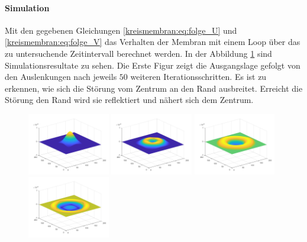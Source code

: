 \paragraph{Simulation}
Mit den gegebenen Gleichungen \ref{kreismembran:eq:folge_U} und \ref{kreismembran:eq:folge_V} das Verhalten der Membran mit einem Loop über das zu untersuchende Zeitintervall berechnet werden. 
In der Abbildung \ref{kreismembran:im:simres_rund} sind Simulationsresultate zu sehen.
Die Erste Figur zeigt die Ausgangslage gefolgt von den Auslenkungen nach jeweils $ 50 $ weiteren Iterationsschritten.
Es ist zu erkennen, wie sich die Störung vom Zentrum an den Rand ausbreitet.
Erreicht die Störung den Rand wird sie reflektiert und nähert sich dem Zentrum. 
\begin{figure}
	\begin{center}
		\label{kreismembran:im:simres_rund}
		\includegraphics[width=0.32\textwidth]{papers/kreismembran/images/sim_1_1.png}
		\includegraphics[width=0.32\textwidth]{papers/kreismembran/images/sim_1_2.png}
		\includegraphics[width=0.32\textwidth]{papers/kreismembran/images/sim_1_3.png}
		\includegraphics[width=0.32\textwidth]{papers/kreismembran/images/sim_1_4.png}

\end{center}
\end{figure}
